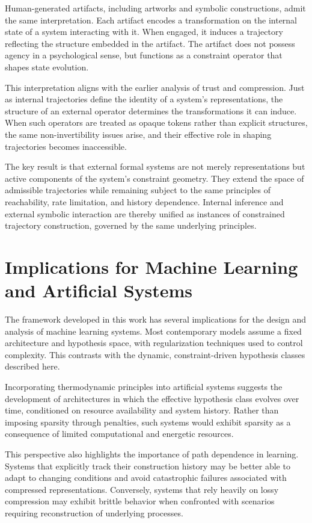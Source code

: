 \documentclass[12pt]{article}
\theoremstyle{plain}
\theoremstyle{definition}
\theoremstyle{remark}
\begin{document}
Human-generated artifacts, including artworks and symbolic constructions, admit the same interpretation. Each artifact encodes a transformation on the internal state of a system interacting with it. When engaged, it induces a trajectory reflecting the structure embedded in the artifact. The artifact does not possess agency in a psychological sense, but functions as a constraint operator that shapes state evolution.

This interpretation aligns with the earlier analysis of trust and compression. Just as internal trajectories define the identity of a system's representations, the structure of an external operator determines the transformations it can induce. When such operators are treated as opaque tokens rather than explicit structures, the same non-invertibility issues arise, and their effective role in shaping trajectories becomes inaccessible.

The key result is that external formal systems are not merely representations but active components of the system's constraint geometry. They extend the space of admissible trajectories while remaining subject to the same principles of reachability, rate limitation, and history dependence. Internal inference and external symbolic interaction are thereby unified as instances of constrained trajectory construction, governed by the same underlying principles.

\section{Implications for Machine Learning and Artificial Systems}

The framework developed in this work has several implications for the design and analysis of machine learning systems. Most contemporary models assume a fixed architecture and hypothesis space, with regularization techniques used to control complexity. This contrasts with the dynamic, constraint-driven hypothesis classes described here.

Incorporating thermodynamic principles into artificial systems suggests the development of architectures in which the effective hypothesis class evolves over time, conditioned on resource availability and system history. Rather than imposing sparsity through penalties, such systems would exhibit sparsity as a consequence of limited computational and energetic resources.

This perspective also highlights the importance of path dependence in learning. Systems that explicitly track their construction history may be better able to adapt to changing conditions and avoid catastrophic failures associated with compressed representations. Conversely, systems that rely heavily on lossy compression may exhibit brittle behavior when confronted with scenarios requiring reconstruction of underlying processes.
\end{document}
